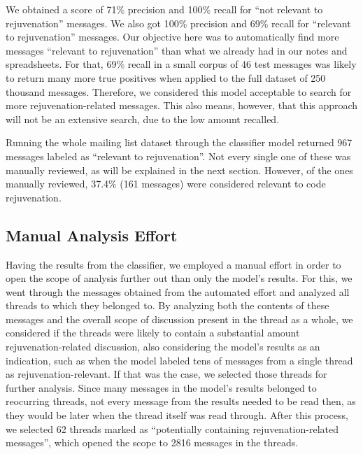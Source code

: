 We obtained a score of 71\% precision and 100\% recall for ``not relevant to rejuvenation'' messages. We also got 100\% precision and 69\% recall for ``relevant to
rejuvenation'' messages. Our objective here was to automatically find more messages ``relevant to rejuvenation'' than what we already had in our notes and spreadsheets.
For that, 69\% recall in a small corpus of 46 test messages was likely to return many more true positives when applied to the full dataset of
250 thousand messages. Therefore, we considered this model acceptable to search for more rejuvenation-related messages. This also means, however,
that this approach will not be an extensive search, due to the low amount recalled.

Running the whole mailing list dataset through the classifier model returned 967 messages labeled as ``relevant to rejuvenation''. Not every single one of these was
manually reviewed, as will be explained in the next section. However, of the ones manually reviewed, 37.4\% (161 messages) were considered
relevant to code rejuvenation.

\subsection{Manual Analysis Effort}


Having the results from the classifier, we employed a manual effort in order to open the scope of analysis further out than only the model's results. For this, we went through the messages obtained from the automated effort and analyzed all threads to which they belonged to. By analyzing both the contents of these messages and the overall scope of discussion present in the thread as a whole, we considered if the threads were likely to contain a substantial amount rejuvenation-related discussion, also considering the model's results as an indication, such as when the model labeled tens of messages from a single thread as rejuvenation-relevant. If that was the case, we selected those threads for further analysis. Since many messages in the model's results belonged to reocurring threads, not every message from the results needed to be read then, as they would be later when the thread itself was read through. After this process, we selected 62 threads marked as ``potentially containing rejuvenation-related messages'', which opened the scope to 2816 messages in the threads.

